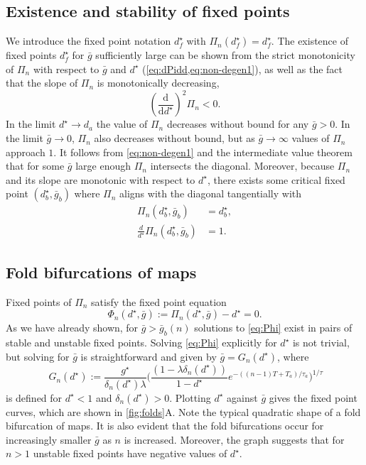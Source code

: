 \subsection{Existence and stability of fixed points}
We introduce the fixed point notation $d^\star_{f}$ with $\Pi_n(d^\star_{f})=d^\star_{f}$.
The existence of fixed points $d^\star_{f}$ for $\bar g$ sufficiently large can be shown from the strict monotonicity of $\Pi_{n}$ with respect to $\bar g$ and $d^\star$ (\cref{eq:dPidd,eq:non-degen1}), as well as the fact that the slope of $\Pi_{n}$ is monotonically decreasing,
\begin{equation}
	\label{eq:non-degen2}
	\left(\frac{\mathrm{d}}{\mathrm{d}d^\star}\right)^2 \Pi_n<0.
\end{equation}
In the limit $d^\star \to d_{a}$ the value of $\Pi_n$ decreases without bound for any $\bar g>0$.
In the limit $\bar g\to 0$, $\Pi_n$ also decreases without bound, but as $\bar g\to \infty$ values of $\Pi_n$ approach $1$.
It follows from \cref{eq:non-degen1} and the intermediate value theorem that for some $\bar g$ large enough $\Pi_n$ intersects the diagonal.
Moreover, because $\Pi_n$ and its slope are monotonic with respect to $d^\star$, there exists some critical fixed point $(d^\star_b, \bar g_b)$ where $\Pi_n$ aligns with the diagonal tangentially with
\begin{align}
	\Pi_n(d^\star_b, \bar g_b)                  & =d^\star_b, \\
	\frac{d}{d^\star}\Pi_n(d^\star_b, \bar g_b) & =1.
\end{align}

\subsection{Fold bifurcations of maps}
Fixed points of $\Pi_n$ satisfy the fixed point equation
\begin{equation}
	\label{eq:Phi}
	\Phi_{n}(d^{\star}, \bar g) := \Pi_{n}(d^{\star}, \bar g)-d^{\star} = 0.
\end{equation}
As we have already shown, for $\bar g > \bar g_b(n)$ solutions to \cref{eq:Phi} exist in pairs of stable and unstable fixed points.
Solving \cref{eq:Phi} explicitly for $d^{\star}$ is not trivial, but solving for $\bar g$ is straightforward and given by $\bar g= G_n(d^\star)$, where
\begin{equation}
	~\label{eq:g}
	G_{n}(d^{\star}) :=
	\frac{g^{\star}}{\delta_n(d^\star)\lambda}
	\Big(
	\frac{(1-\lambda\delta_n(d^\star)) }{1-d^\star} e^{-((n-1)T + T_{a})/\tau_a}
	\Big)^{1/\tau}
\end{equation}
is defined for $d^{\star}<1$ and $\delta_{n}(d^{\star})>0$.
Plotting $d^\star$ against $\bar g$ gives the fixed point curves, which are shown in \cref{fig:folds}A.
Note the typical quadratic shape of a fold bifurcation of maps.
It is also evident that the fold bifurcations occur for increasingly smaller $\bar g$ as $n$ is increased.
Moreover, the graph suggests that for $n>1$ unstable fixed points have negative values of $d^\star$.

